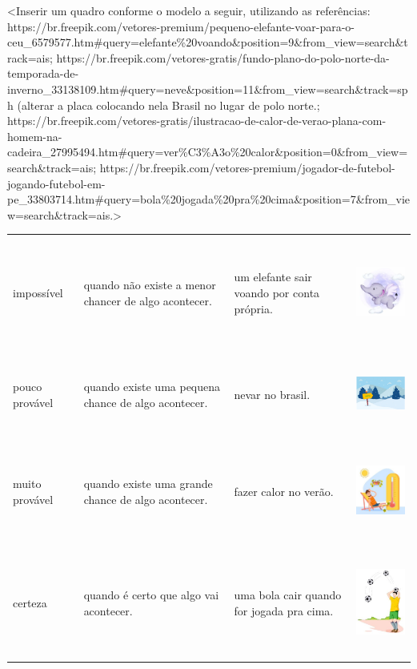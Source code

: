 \textless{}Inserir um quadro conforme o modelo a seguir, utilizando as
referências:
https://br.freepik.com/vetores-premium/pequeno-elefante-voar-para-o-ceu\_6579577.htm\#query=elefante\%20voando\&position=9\&from\_view=search\&track=ais;
https://br.freepik.com/vetores-gratis/fundo-plano-do-polo-norte-da-temporada-de-inverno\_33138109.htm\#query=neve\&position=11\&from\_view=search\&track=sph
(alterar a placa colocando nela Brasil no lugar de polo norte.;
https://br.freepik.com/vetores-gratis/ilustracao-de-calor-de-verao-plana-com-homem-na-cadeira\_27995494.htm\#query=ver\%C3\%A3o\%20calor\&position=0\&from\_view=search\&track=ais;
https://br.freepik.com/vetores-premium/jogador-de-futebol-jogando-futebol-em-pe\_33803714.htm\#query=bola\%20jogada\%20pra\%20cima\&position=7\&from\_view=search\&track=ais.\textgreater{}

\begin{longtable}[]{@{}llll@{}}
\toprule
impossível & quando não existe a menor chancer de algo acontecer. & um
elefante sair voando por conta própria. &
\includegraphics[width=1.42708in,height=1.42708in]{media/image76.jpg}\tabularnewline
pouco provável & quando existe uma pequena chance de algo acontecer. &
nevar no brasil. &
\includegraphics[width=1.52602in,height=1.01167in]{media/image77.png}\tabularnewline
muito provável & quando existe uma grande chance de algo acontecer. &
fazer calor no verão. &
\includegraphics[width=1.30208in,height=1.30208in]{media/image78.jpg}\tabularnewline
certeza & quando é certo que algo vai acontecer. & uma bola cair quando
for jogada pra cima. &
\includegraphics[width=1.04437in,height=1.39696in]{media/image79.jpg}\tabularnewline
\bottomrule
\end{longtable}

